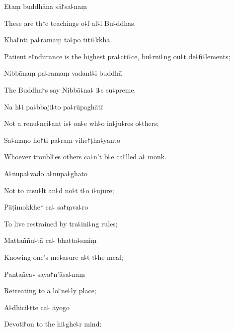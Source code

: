 Etaṃ buddhāna sā꜓sa꜕naṃ

\begin{english}
  These are th꜓e teachings o꜕f al꜕l Bu꜕ddhas.
\end{english}

Kha꜓ntī pa꜕ramaṃ ta꜕po tīti꜕kkhā

\begin{english}
  Patient e꜓ndurance is the highest pra꜕cti꜕ce, bu꜕rni꜕ng ou꜕t de꜕fi꜕lements;
\end{english}

Nibbānaṃ pa꜕ramaṃ vadant꜕i buddhā

\begin{english}
  The Buddha꜓s say Nibbā꜕na꜕ i꜕s su꜕preme.
\end{english}

Na h꜕i pa꜕bbaji꜕to pa꜕rūpaghātī

\begin{english}
  Not a renu꜕nci꜕ant is꜕ on꜕e wh꜕o in꜕ju꜕res o꜕thers;
\end{english}

Sa꜕maṇo ho꜓ti pa꜕raṃ vihe꜓ṭha꜕yanto

\begin{english}
  Whoever troubl꜓es others ca꜕n't b꜕e ca꜓lled a꜕ monk.
\end{english}

\clearpage

A꜕nūpa꜕vādo a꜕nūpa꜕ghāto

\begin{english}
  Not to insu꜕lt an꜕d no꜕t t꜕o i꜕njure;
\end{english}

Pāṭimokkhe꜓ ca꜕ sa꜓ṃva꜕ro

\begin{english}
  To live restrained by tra꜕ini꜕ng rules;
\end{english}

Mattaññu꜕tā ca꜕ bhatta꜕smiṃ

\begin{english}
  Knowing one's me꜕asure a꜕t t꜕he meal;
\end{english}

Pantañca꜕ saya꜓n'āsa꜕naṃ

\begin{english}
  Retreating to a lo꜓ne꜕ly place;
\end{english}

A꜕dhici꜕tte ca꜕ āyogo

\begin{english}
  Devoti꜓on to the hi꜕ghe꜕r mind:
\end{english}

